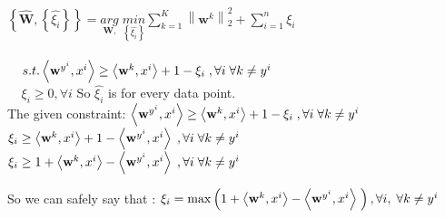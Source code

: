 \documentclass[a4paper,11pt]{article}
\begin{document}
\begin{mlsolution}

\begin{math}
\left \{ \widehat{\textbf{W}}, \left \{ \widehat{\xi _{i}} \right \} \right \} = \underset{\textbf{W},}{arg} \; \underset{ \left \{ \widehat{\xi _{i}} \right \}}{min} \sum_{k=1}^{K} \left \| \textbf{w}^{k} \right \|^{2}_{2} + \sum_{i=1}^{n} \xi _{i}\end{math}\\\\

\begin{math}
\;\;\;\;s.t. \left \langle \textbf{w}^{y^{i}}, x^{i} \right \rangle \geq \left \langle \textbf{w}^{k}, x^{i} \right \rangle + 1 - \xi_{i}\; , \forall i\; \forall k\neq y^{i} \\
\end{math}\\

\begin{math}
\; \; \; \; \xi_{i} \geq 0, \forall i
\end{math}
So \begin{math}\widehat{\xi _{i}}\end{math} is for every data point.\\

The given constraint: \; \; \begin{math} \left \langle \textbf{w}^{y^{i}}, x^{i} \right \rangle \geq \left \langle \textbf{w}^{k}, x^{i} \right \rangle + 1 - \xi_{i}\; , \forall i\; \forall k\neq y^{i} \\ \end{math} \\

\begin{math} \xi_{i} \geq \left \langle \textbf{w}^{k}, x^{i} \right \rangle + 1 - \left \langle \textbf{w}^{y^{i}}, x^{i} \right \rangle \; , \forall i\; \forall k\neq y^{i} \\ \end{math} \\

\begin{math}
\xi_{i} \geq 1 + \left \langle \textbf{w}^{k}, x^{i} \right \rangle - \left \langle \textbf{w}^{y^{i}}, x^{i} \right \rangle \; , \forall i\; \forall k\neq y^{i} \\
\end{math}

So we can safely say that :
\begin{math}
\xi_{i} = \max\left (   1 + \left \langle \textbf{w}^{k}, x^{i} \right \rangle - \left \langle \textbf{w}^{y^{i}}, x^{i} \right \rangle \; \right ), \forall i,\; \forall k\neq y^{i} \\
\end{math}


\end{mlsolution}
\end{document}
